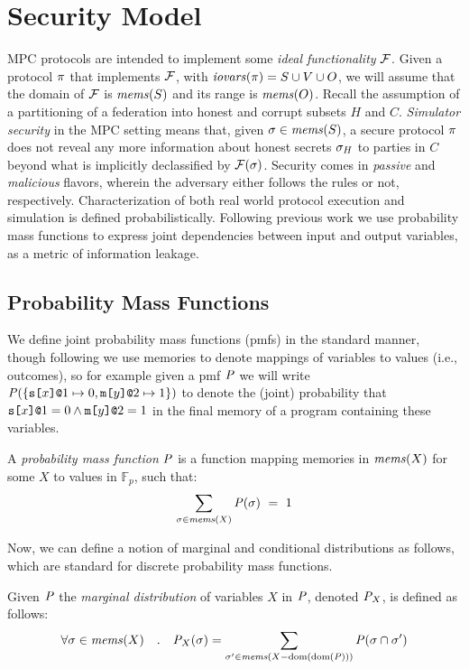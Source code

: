 \section{Security Model}
\label{section-pmf}

MPC protocols are intended to implement some \emph{ideal
functionality} $\mathcal{F}$. Given a protocol $\pi$ that implements
$\mathcal{F}$, with $\mathit{iovars}(\pi) = S \cup V \cup O$, we will assume
that the domain of $\mathcal{F}$ is $\mathit{mems}(S)$ and its range is
$\mathit{mems}(O)$. Recall the assumption of a partitioning of a federation
into honest and corrupt subsets $H$ and $C$.  \emph{Simulator
security} in the MPC setting means that, given $\sigma \in \mathit{mems}(S)$,
a secure protocol $\pi$ does not reveal any more information about
honest secrets $\sigma_H$ to parties in $C$ beyond what is
implicitly declassified by $\mathcal{F}(\sigma)$. Security comes in
\emph{passive} and \emph{malicious} flavors, wherein the adversary
either follows the rules or not, respectively. Characterization of
both real world protocol execution and simulation is defined
probabilistically. Following previous work
\cite{barthe2019probabilistic} we use probability mass functions to
express joint dependencies between input and output variables, as a
metric of information leakage.

\subsection{Probability Mass Functions} 

We define joint probability mass functions (pmfs) in the standard
manner, though following \cite{barthe2019probabilistic} we use
memories to denote mappings of variables to values (i.e., outcomes),
so for example given a pmf $\mathit{P}$ we will write $\mathit{P}(\{ \texttt{s[}x\texttt{]}\texttt{@}1
\mapsto 0, \texttt{m[}y\texttt{]}\texttt{@}2 \mapsto 1 \})$ to denote the (joint) probability that
$\texttt{s[}x\texttt{]}\texttt{@}1 = 0 \wedge \texttt{m[}y\texttt{]}\texttt{@}2 = 1$ in the final memory of a
program containing these variables.
\begin{definition}
  A \emph{probability mass function} $\mathit{P}$ is a function
  mapping memories in $\mathit{mems}(X)$ for some $X$ to values in $\mathbb{F}_p$, such that:
  $$
  \sum_{\sigma \in \mathit{mems}(X)} \mathit{P}(\sigma) \  = \ 1
  $$
\end{definition}
Now, we can define a notion of marginal and conditional
distributions as follows, which are standard for discrete
probability mass functions. 
\begin{definition}
  Given $\mathit{P}$ the \emph{marginal distribution} of variables $X$
  in $\mathit{P}$, denoted ${\mathit{P}}_{X}$, is defined as follows:
  $$
  \forall \sigma \in \mathit{mems}(X) \quad . \quad {\mathit{P}}_{X}(\sigma) =
  \sum_{\sigma' \in \mathit{mems}(X-\mathrm{dom}(\mathrm{dom}(\mathit{P})))} \mathit{P}(\sigma \cap \sigma')
  $$
\end{definition}

